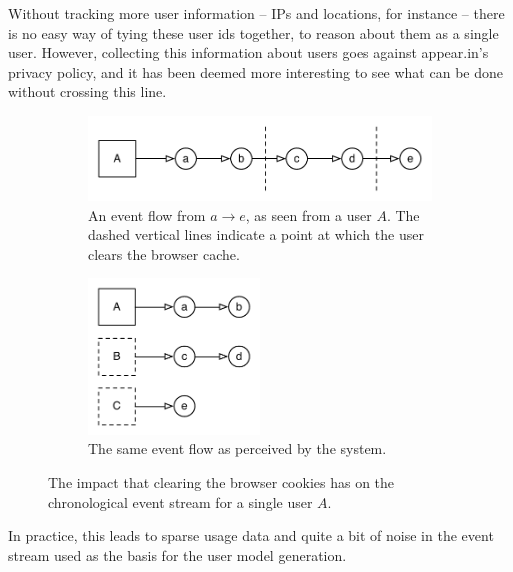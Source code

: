       Without tracking more user information -- IPs and locations, for instance -- there is no easy way of tying these user ids together, to reason about them as a single user. However, collecting this information about users goes against appear.in's privacy policy, and it has been deemed more interesting to see what can be done without crossing this line.

      \begin{figure}[h]
        \centering
          \begin{subfigure}[t]{0.8\textwidth}
            \includegraphics[width=\textwidth]{Figures/event-flow-cache-break-1}
            \caption{An event flow from $a \rightarrow e$, as seen from a user $A$. The dashed vertical lines indicate a point at which the user clears the browser cache.}
            \label{fig:cache_break1}
          \end{subfigure}
          \begin{subfigure}[t]{0.8\textwidth}
            \includegraphics[width=0.5\textwidth]{Figures/event-flow-cache-break-2}
            \caption{The same event flow as perceived by the system.}
            \label{fig:cache_break2}
          \end{subfigure}

          \caption{The impact that clearing the browser cookies has on the chronological event stream for a single user $A$.}
          \label{fig:clear_cookie_impact}
      \end{figure}

      In practice, this leads to sparse usage data and quite a bit of noise in the event stream used as the basis for the user model generation.

